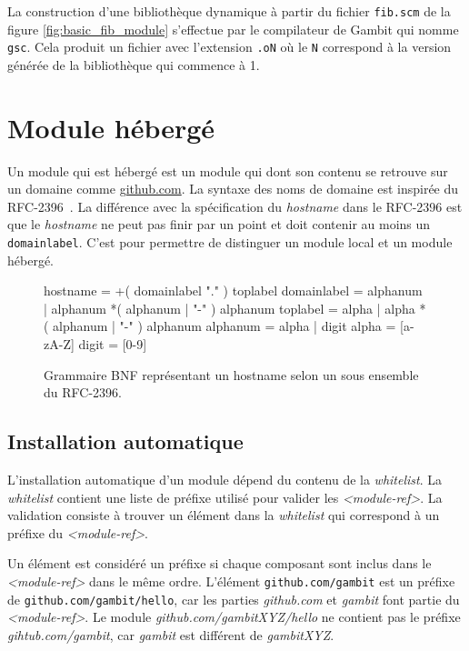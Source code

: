 \vspace{-20pt}
La construction d'une bibliothèque dynamique à partir du fichier \texttt{fib.scm}
de la figure \ref{fig:basic_fib_module} s'effectue par le compilateur de Gambit
qui nomme \texttt{gsc}. Cela produit un fichier avec l'extension \texttt{.oN}
où le \texttt{N} correspond à la version générée de la bibliothèque qui commence à 1.


\section{Module hébergé}

Un module qui est hébergé est un module qui dont son contenu
se retrouve sur un domaine comme \url{github.com}. La syntaxe
des noms de domaine est inspirée du RFC-2396~\cite{RFC:URI-2396}.
La différence avec la spécification du \textit{hostname} dans le RFC-2396
est que le \textit{hostname} ne peut pas finir par un point et doit contenir
au moins un \verb|domainlabel|. C'est pour permettre de distinguer
un module local et un module hébergé. \\

\begin{figure}[ht]
  \centering
  \lstset{frame=single}
  \begin{mplisting}{0.9}
hostname      = +( domainlabel "." ) toplabel
domainlabel   = alphanum | alphanum *( alphanum | "-" ) alphanum
toplabel      = alpha | alpha *( alphanum | "-" ) alphanum
alphanum      = alpha | digit
alpha         = [a-zA-Z]
digit         = [0-9]
\end{mplisting}
  \caption{Grammaire BNF représentant un hostname selon un sous
    ensemble du RFC-2396.}
  \label{lst:hostname->grammar}
\end{figure}


\subsection{Installation automatique}
%
L'installation automatique d'un module dépend du contenu de la
\textit{whitelist}.  La \textit{whitelist} contient une liste de préfixe
utilisé pour valider les \textit{<module-ref>}. La validation consiste
à trouver un élément dans la \textit{whitelist} qui correspond à un
préfixe du \textit{<module-ref>}.

Un élément est considéré un préfixe si chaque composant sont inclus dans le
\textit{<module-ref>} dans le même ordre. L'élément \texttt{github.com/gambit}
est un préfixe de \texttt{github.com/gambit/hello}, car les parties
\textit{github.com} et \textit{gambit} font partie du \textit{<module-ref>}. Le
module \textit{github.com/gambitXYZ/hello} ne contient pas le préfixe
\textit{gihtub.com/gambit}, car \textit{gambit} est différent de
\textit{gambitXYZ}.


